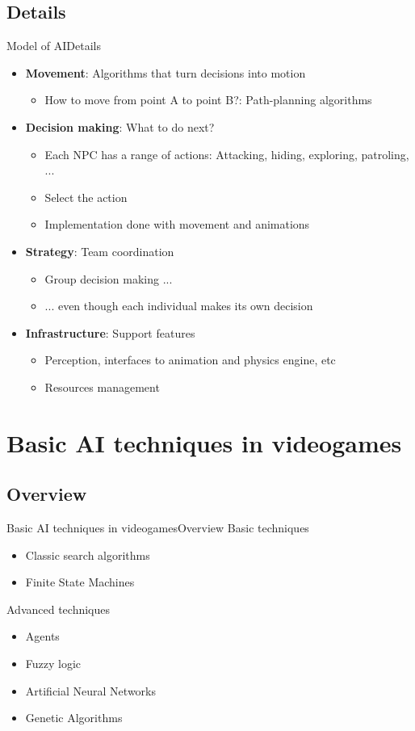 \documentclass[10pt,compress]{beamer} %
\begin{document}
\subsection{Details}
\begin{frame}{Model of AI}{Details}
	\begin{itemize}
	\item \textbf{Movement}: Algorithms that turn decisions into motion
	\begin{itemize}
		\item How to move from point A to point B?: Path-planning algorithms
	\end{itemize}
	\item \textbf{Decision making}: What to do next?
	\begin{itemize}
		\item Each NPC has a range of actions: Attacking, hiding, exploring, patroling, ...
		\item Select the action
		\item Implementation done with movement and animations
	\end{itemize}
	\item \textbf{Strategy}: Team coordination
	\begin{itemize}
		\item Group decision making ...
		\item ... even though each individual makes its own decision
	\end{itemize}
	\item \textbf{Infrastructure}: Support features
	\begin{itemize}
		\item Perception, interfaces to animation and physics engine, etc
		\item Resources management
	\end{itemize}
	\end{itemize}
\end{frame}

\section{Basic AI techniques in videogames}
\subsection{Overview}
\begin{frame}{Basic AI techniques in videogames}{Overview}
	Basic techniques
 	\begin{itemize}
 		\item Classic search algorithms
		\item Finite State Machines
 	\end{itemize}
	
	Advanced techniques
 	\begin{itemize}
 		\item Agents
		\item Fuzzy logic
		\item Artificial Neural Networks
		\item Genetic Algorithms
 	\end{itemize}
	
\end{frame}
\end{document}
